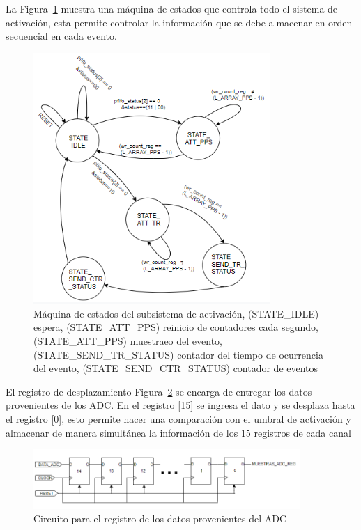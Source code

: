 La Figura~\ref{maquina} muestra una máquina de estados que controla todo el sistema de activación, esta permite controlar la información que se debe almacenar en orden secuencial en cada evento.

\begin{figure}[h!]
\includegraphics[width=0.8\textwidth]{Figs/fsms.PNG} 
\centering
\caption[Máquina de estados del subsistema de activación]{Máquina de estados del subsistema de activación, (STATE\_IDLE) espera, (STATE\_ATT\_PPS) reinicio de contadores cada segundo, (STATE\_ATT\_PPS) muestraeo del evento, (STATE\_SEND\_TR\_STATUS) contador del tiempo de ocurrencia del evento, (STATE\_SEND\_CTR\_STATUS) contador de eventos}
\label{maquina}
\end{figure}

El registro de desplazamiento Figura~\ref{desplazamiento} se encarga de entregar los datos provenientes de los ADC. En el registro [15] se ingresa el dato y se desplaza hasta el registro [0], esto permite hacer una comparación con el umbral de activación y  almacenar de manera simultánea la información de los 15 registros de cada canal


\begin{figure}[H]
\includegraphics[width=0.9\textwidth]{Figs/registro.PNG} 
\centering
\caption{Circuito para el registro de los datos provenientes del ADC}
\label{desplazamiento}
\end{figure}


